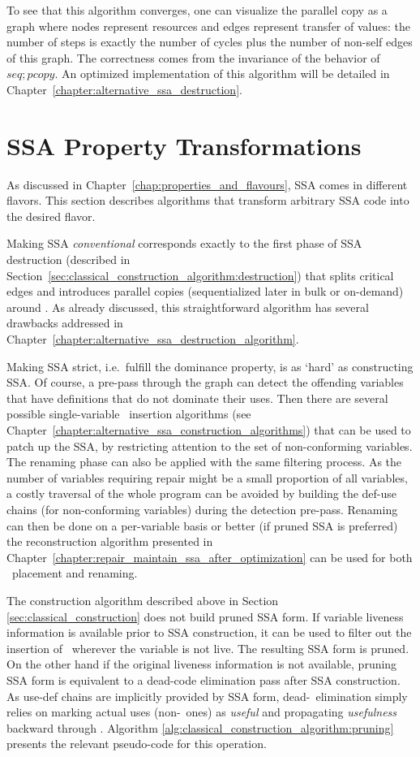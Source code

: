To see that this algorithm converges, one can visualize the parallel copy as a graph where nodes represent resources and edges represent transfer of values: the number of steps is exactly the number of cycles plus the number of non-self edges of this graph. The correctness comes from the invariance of the behavior of $seq; pcopy$. An optimized implementation of this algorithm will be detailed in Chapter~\ref{chapter:alternative_ssa_destruction}.


\section{SSA Property Transformations}
\label{section:classical_construction_algorithm:turning}
As discussed in Chapter~\ref{chap:properties_and_flavours},
SSA comes in different flavors. 
This section describes algorithms that transform
arbitrary SSA code
into the desired flavor.

Making SSA \textit{conventional} corresponds exactly to the first phase of SSA destruction (described in Section~\ref{sec:classical_construction_algorithm:destruction}) that splits critical edges and introduces parallel copies (sequentialized later in bulk or on-demand) around \phifuns. As already discussed, this straightforward algorithm has several drawbacks addressed in Chapter~\ref{chapter:alternative_ssa_destruction_algorithm}.

Making SSA strict, i.e.\ fulfill the dominance property, is as `hard' as constructing SSA. Of course, a pre-pass through the graph can detect the offending variables that have definitions that do not dominate their uses. Then there are several possible single-variable \phifun\ insertion algorithms (see Chapter~\ref{chapter:alternative_ssa_construction_algorithms}) that can be used to patch up the SSA, by restricting attention to the set of non-conforming variables. The renaming phase can also be applied with the same filtering process. As the number of variables requiring repair might be a small proportion of all variables, a costly traversal of the whole program can be avoided by building the def-use chains (for non-conforming variables) during the detection pre-pass. Renaming can then be done on a per-variable basis or better (if pruned SSA is preferred) the reconstruction algorithm presented in Chapter~\ref{chapter:repair_maintain_ssa_after_optimization} can be used for both \phifuns\ placement and renaming.

The construction algorithm described above in
Section \ref{sec:classical_construction} does not
build pruned SSA form. 
If variable liveness information is available prior
to SSA construction, it can be used to filter out the 
insertion of \phifuns\ wherever the variable is not live.
The resulting SSA form is pruned.
On the other hand
if the original liveness information is not available, 
pruning SSA form is equivalent to a dead-code elimination pass
after SSA construction.
As use-def chains are implicitly provided by SSA form, 
dead-\phifun\ elimination simply relies on marking actual uses 
(non-\phifun\ ones) as \emph{useful} and propagating 
\emph{usefulness} backward through \phifuns.
Algorithm \ref{alg:classical_construction_algorithm:pruning} 
presents the relevant pseudo-code for this operation.

